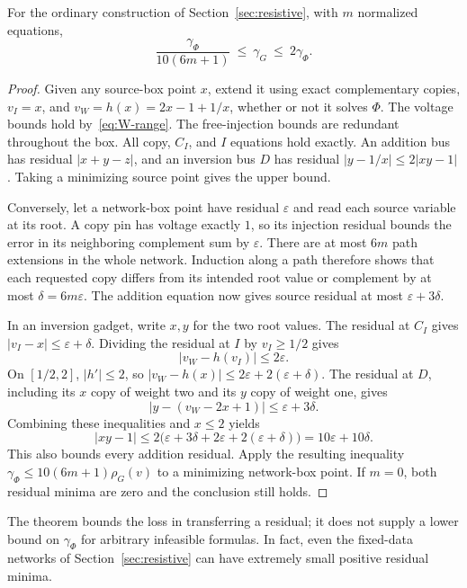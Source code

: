 \begin{theorem}
\label{thm:residual-transfer}
For the ordinary construction of Section~\ref{sec:resistive}, with $m$
normalized equations,
\begin{equation}
 \frac{\gamma_\Phi}{10(6m+1)}\ \le\ \gamma_G
       \ \le\ 2\gamma_\Phi.
 \label{eq:residual-transfer}
\end{equation}
\end{theorem}
\begin{proof}
Given any source-box point $x$, extend it using exact complementary copies,
$v_I=x$, and $v_W=h(x)=2x-1+1/x$, whether or not it solves $\Phi$.
The voltage bounds hold by~\eqref{eq:W-range}. The free-injection bounds
are redundant throughout the box. All copy, $C_I$, and $I$ equations hold
exactly. An addition bus has residual $|x+y-z|$, and an inversion bus $D$
has residual $|y-1/x|\le2|xy-1|$. Taking a minimizing source point gives
the upper bound.

Conversely, let a network-box point have residual $\varepsilon$ and read
each source variable at its root. A copy pin has voltage exactly $1$, so its
injection residual bounds the error in its neighboring complement sum by
$\varepsilon$. There are at most $6m$ path extensions in the whole network.
Induction along a path therefore shows that each requested copy differs from
its intended root value or complement by at most
$\delta=6m\varepsilon$. The addition equation now gives source residual
at most $\varepsilon+3\delta$.

In an inversion gadget, write $x,y$ for the two root values. The residual
at $C_I$ gives $|v_I-x|\le\varepsilon+\delta$. Dividing the residual at
$I$ by $v_I\ge1/2$ gives
\[
 |v_W-h(v_I)|\le2\varepsilon.
\]
On $[1/2,2]$, $|h'|\le2$, so
$|v_W-h(x)|\le2\varepsilon+2(\varepsilon+\delta)$.
The residual at $D$, including its $x$ copy of weight two and its $y$
copy of weight one, gives
\[
 |y-(v_W-2x+1)|\le\varepsilon+3\delta.
\]
Combining these inequalities and $x\le2$ yields
\[
 |xy-1|\le2\bigl(\varepsilon+3\delta+2\varepsilon
                        +2(\varepsilon+\delta)\bigr)
           =10\varepsilon+10\delta.
\]
This also bounds every addition residual. Apply the resulting inequality
$\gamma_\Phi\le10(6m+1)\rho_G(v)$ to a minimizing network-box point.
If $m=0$, both residual minima are zero and the conclusion still holds.
\end{proof}

The theorem bounds the loss in transferring a residual; it does not supply
a lower bound on $\gamma_\Phi$ for arbitrary infeasible formulas. In fact,
even the fixed-data networks of Section~\ref{sec:resistive} can have
extremely small positive residual minima.

